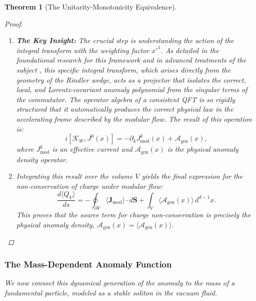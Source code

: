 \documentclass[11pt, letterpaper]{report}
\theoremstyle{plain} %
\newtheorem{theorem}{Theorem}[chapter]
\theoremstyle{definition} %
\theoremstyle{remark} %
\newcommand{\ModularK}{\mathcal{K}}
\newcommand{\AnomPoly}{\mathcal{A}}
\begin{document}
\begin{theorem}[The Unitarity-Monotonicity Equivalence]
\begin{proof}
\begin{enumerate}
    \item \textbf{The Key Insight:} The crucial step is understanding the action of the integral transform with the weighting factor $x'^1$. As detailed in the foundational research for this framework \cite{Yumeto_Akagi_2025} and in advanced treatments of the subject \cite{Hollands2002Aspects}, this specific integral transform, which arises directly from the geometry of the Rindler wedge, acts as a projector that isolates the correct, local, and Lorentz-covariant anomaly polynomial from the singular terms of the commutator. The operator algebra of a consistent QFT is so rigidly structured that it automatically produces the correct physical law in the accelerating frame described by the modular flow. The result of this operation is:
    \begin{equation}
        i[\ModularK_W, J^0(x)] = -\partial_k J^k_{\text{mod}}(x) + \AnomPoly_{\text{gen}}(x),
    \end{equation}
    where $J^k_{\text{mod}}$ is an effective current and $\AnomPoly_{\text{gen}}(x)$ is the physical anomaly density operator.
    
    \item Integrating this result over the volume $V$ yields the final expression for the non-conservation of charge under modular flow:
    \begin{equation}
        \frac{d\langle Q_V \rangle}{ds} = -\oint_{\partial V} \langle \mathbf{J}_{\text{mod}} \rangle \cdot d\mathbf{S} + \int_V \langle \AnomPoly_{\text{gen}}(x) \rangle \, d^{d-1}x.
    \end{equation}
    This proves that the source term for charge non-conservation is precisely the physical anomaly density, $\mathcal{A}_{\text{gen}}(x) = \langle \AnomPoly_{\text{gen}}(x) \rangle$.
\end{enumerate}
\end{proof}

\subsubsection{The Mass-Dependent Anomaly Function}
\label{subsubsec:mass_anomaly_function}

We now connect this dynamical generation of the anomaly to the mass of a fundamental particle, modeled as a stable soliton in the vacuum fluid.


\end{theorem}
\end{document}
